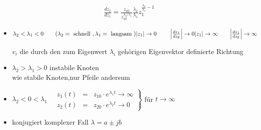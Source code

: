 \documentclass[ngerman]{tudscrreprt}
\begin{document}
\begin{itemize}
\begin{align}
{\frac{d z_2}{d z_1} = \frac{z_{20}}{z_{10}^{\lambda_2/\lambda_1}} \frac{\lambda_2}
{\lambda_1} z_1^{ \frac{\lambda_2}{\lambda_1} - 1 }
}
\tag{2.4}
\end{align}
\item $\lambda_2 < \lambda_1 < 0 \qquad (\lambda_2 = \text{ schnell } , \lambda_1 = \text{ langsam })\\
|z_1| \rightarrow 0 \qquad ~\Big|\frac{d z_1}{d z_2}\Big|\rightarrow 0\\
|z_1| \rightarrow \infty \qquad \Big|\frac{d z_1}{d z_2}\Big|\rightarrow \infty \\
$
\begin{figure}[H]  
  \centering
  \def\svgwidth{300pt} 
   
\end{figure} 
$v_i$ die durch den zum Eigenwert $\lambda_i$ gehörigen Eigenvektor definierte Richtung
\item $\lambda_2 > \lambda_1 > 0$ instabile Knoten \\wie stabile Knoten,nur Pfeile andersum
\item $\lambda_2 < 0 < \lambda_1 \quad \left.
\begin{matrix}
z_1(t) &=& z_{10}\cdot e^{\lambda_1 t} \rightarrow \infty \\
z_2(t) &=& z_{20}\cdot e^{\lambda_2 t} \rightarrow 0 
\end{matrix}
\right\}$ für $t\rightarrow \infty$ 
\begin{figure}[H]  
  \centering
  \def\svgwidth{300pt} 
   
\end{figure}
\item konjugiert komplexer Fall $\lambda = a \pm jb$
\begin{figure}[H]  
  \centering
  \def\svgwidth{300pt} 
   
\end{figure} 
\end{itemize} 
\end{document}
